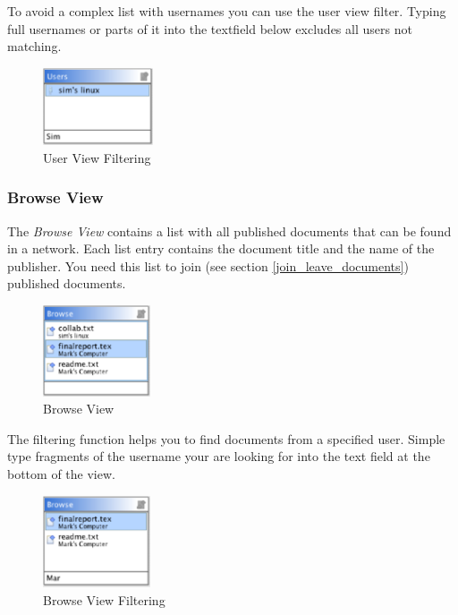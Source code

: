 \documentclass[11pt,a4paper]{article}
\begin{document}
To avoid a complex list with usernames you can use the user view filter. Typing full usernames or parts of it into the textfield below excludes all users not matching.

\begin{figure}[H]
\begin{center}
  \includegraphics[height=0.9in, width=1.28in]{../images/usermanual/uview_filtering.eps}
\caption{User View Filtering}
\label{view_user_filter}
\end{center}
\end{figure}

\subsubsection{Browse View}
The \textit{Browse View} contains a list with all published documents that can be found in a network. Each list entry contains the document title and the name of the publisher. You need this list to join (see section \ref{join_leave_documents}) published documents.

\begin{figure}[H]
\begin{center}
  \includegraphics[height=1.06in, width=1.25in]{../images/usermanual/bview_overview.eps}
\caption{Browse View}
\label{view_browse}
\end{center}
\end{figure}

The filtering function helps you to find documents from a specified user. Simple type fragments of the username your are looking for into the text field at the bottom of the view.

\begin{figure}[H]
\begin{center}
  \includegraphics[height=1.07in, width=1.25in]{../images/usermanual/bview_filtering.eps}
\caption{Browse View Filtering}
\label{view_browse_filter}
\end{center}
\end{figure}
\end{document}
